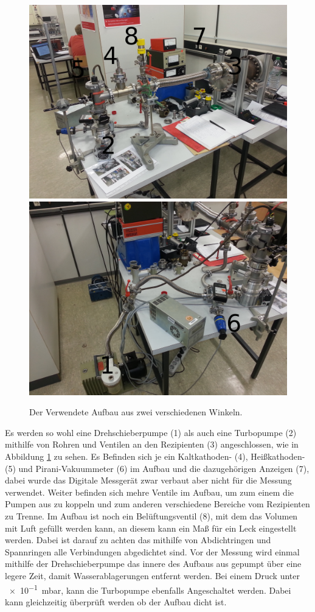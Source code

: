\begin{figure}[h!]
\centering
\includegraphics[scale=0.06]{../Grafiken/Aufbau_.jpg}
\includegraphics[scale=0.06]{../Grafiken/Drehschieber_.jpg}
\caption{Der Verwendete Aufbau aus zwei verschiedenen Winkeln.\label{fig:Aufbau}}
\end{figure}
Es werden so wohl eine Drehschieberpumpe (1) als auch eine Turbopumpe (2) mithilfe von Rohren und Ventilen an den Rezipienten (3) angeschlossen, wie in Abbildung \ref{fig:Aufbau} zu sehen.
Es Befinden sich je ein Kaltkathoden- (4), Heißkathoden- (5) und Pirani-Vakuummeter (6) im Aufbau und die dazugehörigen Anzeigen (7), dabei wurde das Digitale Messgerät zwar verbaut aber nicht für die Messung verwendet.
Weiter befinden sich mehre Ventile im Aufbau, um zum einem die Pumpen aus zu koppeln und zum anderen verschiedene Bereiche vom Rezipienten zu Trenne. Im Aufbau ist noch ein Belüftungsventil (8), mit dem das Volumen mit Luft gefüllt werden kann, an diesem kann ein Maß für ein Leck eingestellt werden.
Dabei ist darauf zu achten das mithilfe von Abdichtringen und Spannringen alle Verbindungen abgedichtet sind.
Vor der Messung wird einmal mithilfe der Drehschieberpumpe  das innere des Aufbaus aus gepumpt über eine legere Zeit, damit Wasserablagerungen entfernt werden. Bei einem Druck unter \SI{e-1}{\milli\bar}, kann die Turbopumpe ebenfalls Angeschaltet werden. Dabei kann gleichzeitig überprüft werden ob der Aufbau dicht ist.
